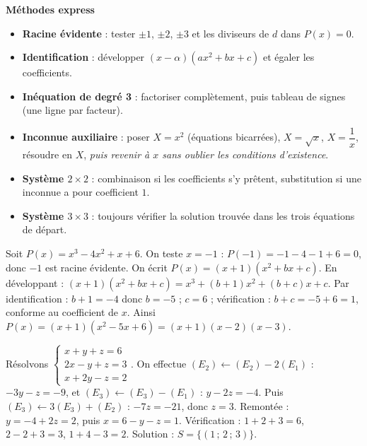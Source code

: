 \documentclass[11pt]{article}
\begin{document}
\begin{aretenir}
\textbf{Méthodes express}
\begin{itemize}
  \item \textbf{Racine évidente} : tester $\pm1$, $\pm2$, $\pm3$ et les diviseurs de $d$ dans $P(x)=0$.
  \item \textbf{Identification} : développer $(x-\alpha)(ax^2+bx+c)$ et égaler les coefficients.
  \item \textbf{Inéquation de degré 3} : factoriser complètement, puis tableau de signes (une ligne par facteur).
  \item \textbf{Inconnue auxiliaire} : poser $X=x^2$ (équations bicarrées), $X=\sqrt{x}$, $X=\dfrac{1}{x}$, résoudre en $X$, \emph{puis revenir à $x$ sans oublier les conditions d'existence}.
  \item \textbf{Système $2\times2$} : combinaison si les coefficients s'y prêtent, substitution si une inconnue a pour coefficient $1$.
  \item \textbf{Système $3\times3$} : toujours vérifier la solution trouvée dans les trois équations de départ.
\end{itemize}
\end{aretenir}

\begin{exemplebox}
Soit $P(x)=x^3-4x^2+x+6$. On teste $x=-1$ : $P(-1)=-1-4-1+6=0$, donc $-1$ est racine évidente. On écrit $P(x)=(x+1)(x^2+bx+c)$. En développant : $(x+1)(x^2+bx+c)=x^3+(b+1)x^2+(b+c)x+c$. Par identification : $b+1=-4$ donc $b=-5$ ; $c=6$ ; vérification : $b+c=-5+6=1$, conforme au coefficient de $x$. Ainsi $P(x)=(x+1)(x^2-5x+6)=(x+1)(x-2)(x-3)$.
\end{exemplebox}

\begin{exemplebox}
Résolvons $\begin{cases} x+y+z=6 \\ 2x-y+z=3 \\ x+2y-z=2 \end{cases}$. On effectue $(E_2)\leftarrow(E_2)-2(E_1)$ : $-3y-z=-9$, et $(E_3)\leftarrow(E_3)-(E_1)$ : $y-2z=-4$. Puis $(E_3)\leftarrow 3(E_3)+(E_2)$ : $-7z=-21$, donc $z=3$. Remontée : $y=-4+2z=2$, puis $x=6-y-z=1$. Vérification : $1+2+3=6$, $2-2+3=3$, $1+4-3=2$. Solution : $S=\{(1\,;\,2\,;\,3)\}$.
\end{exemplebox}
\end{document}
